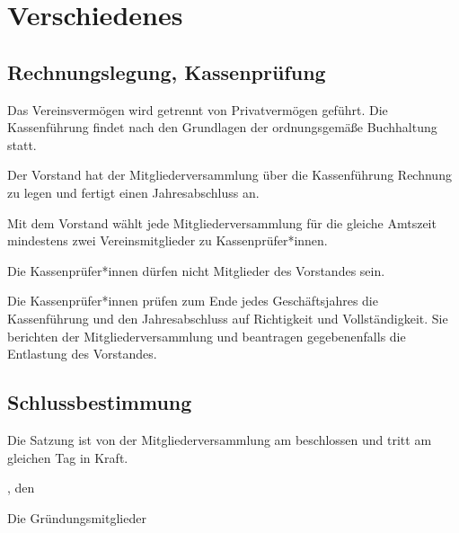 \chapter{Verschiedenes}

\section{Rechnungslegung, Kassenprüfung}
\begin{absätze}
	\item Das Vereinsvermögen wird getrennt von Privatvermögen geführt. Die Kassenführung findet nach den Grundlagen der ordnungsgemäße Buchhaltung statt.
	\item Der Vorstand hat der Mitgliederversammlung über die Kassenführung Rechnung zu legen und fertigt einen Jahresabschluss an.
	\item Mit dem Vorstand wählt jede Mitgliederversammlung für die gleiche Amtszeit mindestens zwei Vereinsmitglieder zu Kassenprüfer*innen. 
	\item Die Kassenprüfer*innen dürfen nicht Mitglieder des Vorstandes sein. 
    \item Die Kassenprüfer*innen prüfen zum Ende jedes Geschäftsjahres die Kassenführung und den Jahresabschluss auf Richtigkeit und Vollständigkeit. Sie berichten der Mitgliederversammlung und beantragen gegebenenfalls die Entlastung des Vorstandes.
\end{absätze}

\section{Schlussbestimmung}
Die Satzung ist von der Mitgliederversammlung am \DatumSatzung{} beschlossen und tritt am gleichen Tag in Kraft.

\vfill %

\Stadt{}, den \DatumSatzung{}

Die Gründungsmitglieder
